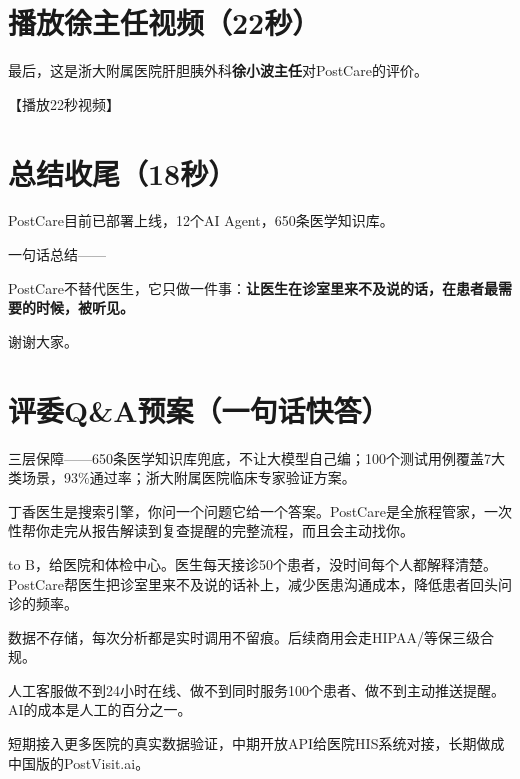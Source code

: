 \documentclass[UTF8, a4paper, 11pt]{ctexart}
\begin{document}
\section{播放徐主任视频（22秒）}

最后，这是浙大附属医院肝胆胰外科\textbf{徐小波主任}对PostCare的评价。

{\color{gray}\small 【播放22秒视频】}

\section{总结收尾（18秒）}

PostCare目前已部署上线，12个AI Agent，650条医学知识库。

一句话总结——

\begin{successbox}[金句]
PostCare不替代医生，它只做一件事：\textbf{让医生在诊室里来不及说的话，在患者最需要的时候，被听见。}
\end{successbox}

谢谢大家。

\newpage
\section{评委Q\&A预案（一句话快答）}

\begin{infobox}[Q1：医学准确性怎么保证？]
三层保障——650条医学知识库兜底，不让大模型自己编；100个测试用例覆盖7大类场景，93\%通过率；浙大附属医院临床专家验证方案。
\end{infobox}

\begin{infobox}
丁香医生是搜索引擎，你问一个问题它给一个答案。PostCare是全旅程管家，一次性帮你走完从报告解读到复查提醒的完整流程，而且会主动找你。
\end{infobox}

\begin{infobox}[Q3：商业模式是什么？]
to B，给医院和体检中心。医生每天接诊50个患者，没时间每个人都解释清楚。PostCare帮医生把诊室里来不及说的话补上，减少医患沟通成本，降低患者回头问诊的频率。
\end{infobox}

\begin{infobox}[Q4：隐私和合规怎么做？]
数据不存储，每次分析都是实时调用不留痕。后续商用会走HIPAA/等保三级合规。
\end{infobox}

\begin{infobox}[Q5：为什么用AI而不是人工客服？]
人工客服做不到24小时在线、做不到同时服务100个患者、做不到主动推送提醒。AI的成本是人工的百分之一。
\end{infobox}

\begin{infobox}[Q6：这个项目后续打算怎么做？]
短期接入更多医院的真实数据验证，中期开放API给医院HIS系统对接，长期做成中国版的PostVisit.ai。
\end{infobox}
\end{document}
